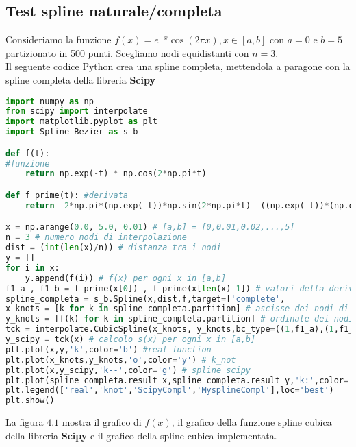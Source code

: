 \documentclass[a4paper,12pt]{report}
\theoremstyle{definition}
\begin{document}
\subsection{Test spline naturale/completa}
Consideriamo la funzione $f(x) = e^{-x}\cos(2\pi x) , x\in[a,b]$ con $a = 0$ e $b = 5$ partizionato in 500 punti. Scegliamo nodi equidistanti con $n = 3$.\\
Il seguente codice Python crea una spline completa, mettendola a paragone con la spline completa della libreria \textbf{Scipy}
\begin{lstlisting}[language=Python]
import numpy as np
from scipy import interpolate
import matplotlib.pyplot as plt
import Spline_Bezier as s_b

def f(t):
#funzione
	return np.exp(-t) * np.cos(2*np.pi*t)

def f_prime(t): #derivata
	return -2*np.pi*(np.exp(-t))*np.sin(2*np.pi*t) -((np.exp(-t))*(np.cos(2*np.pi*t)))

x = np.arange(0.0, 5.0, 0.01) # [a,b] = [0,0.01,0.02,...,5]
n = 3 # numero nodi di interpolazione
dist = (int(len(x)/n)) # distanza tra i nodi
y = []
for i in x:
	y.append(f(i)) # f(x) per ogni x in [a,b]
f1_a , f1_b = f_prime(x[0]) , f_prime(x[len(x)-1]) # valori della derivata prima agli estremi
spline_completa = s_b.Spline(x,dist,f,target=['complete',				[(1,f1_a),(1,f1_b)]]) # creazione della spline completa
x_knots = [k for k in spline_completa.partition] # ascisse dei nodi di interpolazione
y_knots = [f(k) for k in spline_completa.partition] # ordinate dei nodi di interpolazione
tck = interpolate.CubicSpline(x_knots, y_knots,bc_type=((1,f1_a),(1,f1_b))) # rappresentazione Scipyspline completa s(x)
y_scipy = tck(x) # calcolo s(x) per ogni x in [a,b]
plt.plot(x,y,'k',color='b') #real function
plt.plot(x_knots,y_knots,'o',color='y') # k_not
plt.plot(x,y_scipy,'k--',color='g') # spline scipy
plt.plot(spline_completa.result_x,spline_completa.result_y,'k:',color='r') #Myspline
plt.legend(['real','knot','ScipyCompl','MysplineCompl'],loc='best')
plt.show()
\end{lstlisting}
La figura $4.1$ mostra il grafico di $f(x)$, il grafico della funzione spline cubica della libreria \textbf{Scipy} e il grafico della spline cubica implementata.\\
\end{document}

